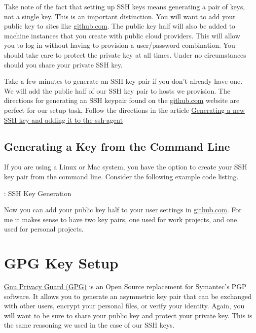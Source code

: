 \justifying
Take note of the fact that setting up SSH keys means generating a pair of keys, not a single key. This is an important 
distinction. You will want to add your public key to sites like \href{github.com}{github.com}. The public key half will
also be added to machine instances that you create with public cloud providers. This will allow you to log in without
having to provision a user/password combination. You should take care to protect the private key at all times. Under no circumstances
should you share your private SSH key. \cite{ssh}

\justifying
Take a few minutes to generate an SSH key pair if you don't already have one. We will add the public half of
our SSH key pair to hosts we provision. The directions for generating an SSH keypair found on the
\href{github.com}{github.com} website are perfect for our setup task. Follow the directions in the article 
\href{https://docs.github.com/en/github/authenticating-to-github/connecting-to-github-with-ssh/generating-a-new-ssh-key-and-adding-it-to-the-ssh-agent}{Generating a new SSH key and adding it to the ssh-agent}

\subsection{Generating a Key from the Command Line}

If you are using a Linux or Mac system, you have the option to create your SSH key pair from the command line. Consider 
the following example code listing.

\begin{mybox}{\thetcbcounter: SSH Key Generation}

\end{mybox}

\justifying
Now you can add your public key half to your user settings in \href{github.com}{github.com}. For me it makes sense to have
two key pairs, one used for work projects, and one used for personal projects.

\section{GPG Key Setup}

\justifying
\href{https://gnupg.org/}{Gnu Privacy Guard (GPG)} is an Open Source replacement for Symantec's PGP software. It allows you
to generate an asymmetric key pair that can be exchanged with other users, encrypt your personal files, or verify your identity.
Again, you will want to be sure to share your public key and protect your private key. This is the same reasoning we used in the
case of our SSH keys.

